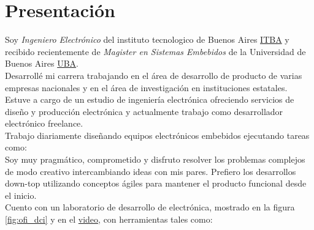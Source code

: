 \section{Presentación}
Soy \emph{Ingeniero Electrónico} del instituto tecnologico de Buenos Aires
\href{\linkitba}{ITBA} y recibido recientemente de \emph{Magister en Sistemas Embebidos} de
la Universidad de Buenos Aires \href{\linkuba}{UBA}.\\
Desarrollé mi carrera trabajando en el área de desarrollo de producto de varias
empresas nacionales y en el área de investigación en instituciones estatales.\\
Estuve a cargo de un estudio de ingeniería electrónica ofreciendo servicios de
diseño y producción electrónica y actualmente trabajo como desarrollador
electrónico freelance.\\ %
Trabajo diariamente diseñando equipos electrónicos embebidos ejecutando tareas como: \\
Soy muy pragmático, comprometido y disfruto resolver los problemas complejos de
modo creativo intercambiando ideas con mis pares. Prefiero los desarrollos
down-top utilizando conceptos ágiles para mantener el producto funcional desde
el inicio.\\
Cuento con un laboratorio de desarrollo de electrónica, mostrado en la figura \ref{fig:ofi_dci} y en el \href{\linkofidci}{video}, con herramientas tales como: \\
